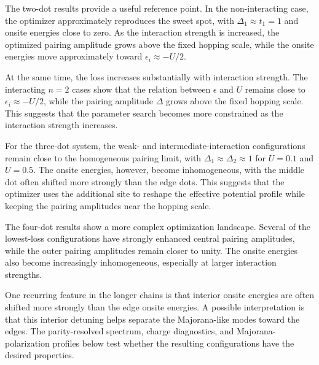 The two-dot results provide a useful reference point. In the non-interacting case, the optimizer approximately reproduces the sweet spot, with $\Delta_1 \approx t_1=1$ and onsite energies close to zero. As the interaction strength is increased, the optimized pairing amplitude grows above the fixed hopping scale, while the onsite energies move approximately toward $\epsilon_i \approx -U/2$. 

At the same time, the loss increases substantially with interaction strength. The interacting $n=2$ cases show that the relation between $\epsilon$ and $U$ remains close to $\epsilon_i \approx -U/2$, while the pairing amplitude $\Delta$ grows above the fixed hopping scale. This suggests that the parameter search becomes more constrained as the interaction strength increases. 


For the three-dot system, the weak- and intermediate-interaction configurations remain close to the homogeneous pairing limit, with $\Delta_1\approx\Delta_2\approx 1$ for $U=0.1$ and $U=0.5$. The onsite energies, however, become inhomogeneous, with the middle dot often shifted more strongly than the edge dots. This suggests that the optimizer uses the additional site to reshape the effective potential profile while keeping the pairing amplitudes near the hopping scale.

The four-dot results show a more complex optimization landscape. Several of the lowest-loss configurations have strongly enhanced central pairing amplitudes, while the outer pairing amplitudes remain closer to unity. The onsite energies also become increasingly inhomogeneous, especially at larger interaction strengths. 

One recurring feature in the longer chains is that interior onsite energies are often shifted more strongly than the edge onsite energies. A possible interpretation is that this interior detuning helps separate the Majorana-like modes toward the edges. The parity-resolved spectrum, charge diagnostics, and Majorana-polarization profiles below test whether the resulting configurations have the desired properties.

